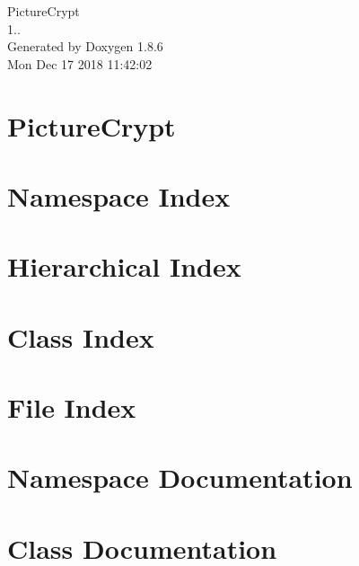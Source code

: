 \documentclass[twoside]{book}
\newcommand{\clearemptydoublepage}{%
  \newpage{\pagestyle{empty}\cleardoublepage}%
}
\begin{document}
\hypersetup{pageanchor=false}
\begin{titlepage}
\vspace*{7cm}
\begin{center}%
{\Large Picture\-Crypt \\[1ex]\large 1.. }\\
\vspace*{1cm}
{\large Generated by Doxygen 1.8.6}\\
\vspace*{0.5cm}
{\small Mon Dec 17 2018 11:42:02}\\
\end{center}
\end{titlepage}
\clearemptydoublepage
\tableofcontents
\clearemptydoublepage
{}
\hypersetup{pageanchor=true}

\chapter{Picture\-Crypt}
\label{index}\hypertarget{index}{}
\chapter{Namespace Index}

\chapter{Hierarchical Index}

\chapter{Class Index}

\chapter{File Index}

\chapter{Namespace Documentation}



\chapter{Class Documentation}







\end{document}

